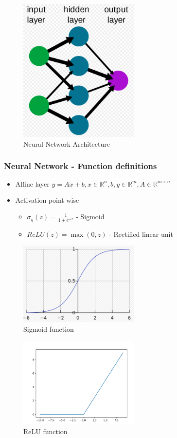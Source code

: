 \documentclass[12pt]{report}
\begin{document}
\begin{figure}[H]\centering\includegraphics[width=6cm]{FFNN.png}\caption{Neural Network Architecture}\end{figure}

\newpage
\subsubsection{Neural Network - Function definitions}
\begin{itemize}
	\item Affine layer $y = Ax + b , x \in \mathbb{R}^n, b, y \in \mathbb{R}^m, A \in \mathbb{R}^{m \times n}$
	\item Activation point wise
	\begin{itemize}
		\item $\sigma_g(z) = \frac{1}{1+e^{-z}}$ - Sigmoid 
		\item $ReLU(z) = \max(0, z)$  - Rectified linear unit
	\end{itemize}	
\end{itemize}

\begin{figure}[H]\centering\includegraphics[width=6cm]{sigmoid.png}\caption{Sigmoid function}\end{figure}
\begin{figure}[H]\centering\includegraphics[width=6cm]{RELU.png}\caption{ReLU function}\end{figure}
\end{document}
